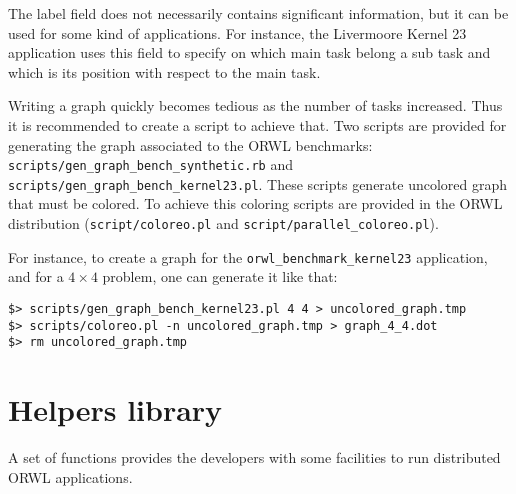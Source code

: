 \documentclass[10pt]{article}
\begin{document}
The label field does not necessarily contains significant information,
but it can be used for some kind of applications. For instance, the
Livermoore Kernel 23 application uses this field to specify on which
main task belong a sub task and which is its position with respect to
the main task.

Writing a graph quickly becomes tedious as the number of tasks
increased. Thus it is recommended to create a script to achieve
that. Two scripts are provided for generating the graph associated to
the ORWL benchmarks:\\ \texttt{scripts/gen\_graph\_bench\_synthetic.rb} and
\texttt{scripts/gen\_graph\_bench\_kernel23.pl}. These scripts generate
uncolored graph that must be colored. To achieve this coloring scripts
are provided in the ORWL distribution (\texttt{script/coloreo.pl} and
\texttt{script/parallel\_coloreo.pl}).

For instance, to create a graph for the
\texttt{orwl\_benchmark\_kernel23} application, and for a $4\times 4$ problem,
one can generate it like that:
\begin{verbatim}
$> scripts/gen_graph_bench_kernel23.pl 4 4 > uncolored_graph.tmp
$> scripts/coloreo.pl -n uncolored_graph.tmp > graph_4_4.dot
$> rm uncolored_graph.tmp
\end{verbatim}

\section{Helpers library}
A set of functions provides the developers with some facilities to
run distributed ORWL applications.
\end{document}
